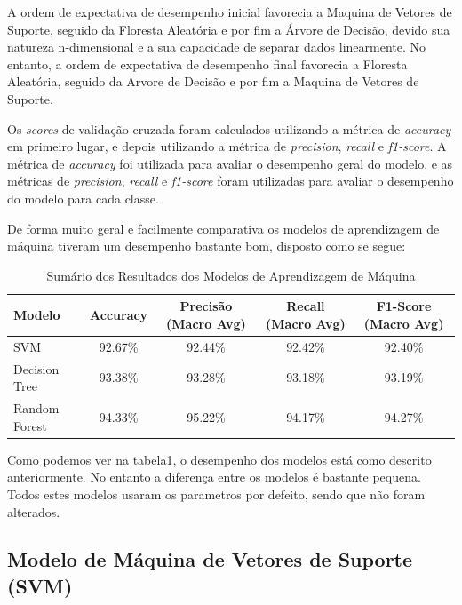 \documentclass{easychair}
\begin{document}
A ordem de expectativa de desempenho inicial favorecia a Maquina de Vetores de Suporte, seguido da Floresta Aleatória e por fim a Árvore de Decisão, devido sua natureza n-dimensional e a sua capacidade de separar dados linearmente. No entanto, a ordem de expectativa de desempenho final favorecia a Floresta Aleatória, seguido da Arvore de Decisão e por fim a Maquina de Vetores de Suporte.

Os \textit{scores} de validação cruzada foram calculados utilizando a métrica de \textit{accuracy} em primeiro lugar, e depois utilizando a métrica de \textit{precision}, \textit{recall} e \textit{f1-score}. A métrica de \textit{accuracy} foi utilizada para avaliar o desempenho geral do modelo, e as métricas de \textit{precision}, \textit{recall} e \textit{f1-score} foram utilizadas para avaliar o desempenho do modelo para cada classe.

De forma muito geral e facilmente comparativa os modelos de aprendizagem de máquina tiveram um desempenho bastante bom, disposto como se segue:

\begin{table}[ht]
  \centering
  \begin{tabular}{l c c c c}
  \toprule
  Modelo         & Accuracy & Precisão (Macro Avg)  & Recall (Macro Avg) & F1-Score (Macro Avg) \\
  \midrule
  SVM            & 92.67\%  & 92.44\%               & 92.42\%            & 92.40\%             \\
  Decision Tree  & 93.38\%  & 93.28\%               & 93.18\%            & 93.19\%             \\
  Random Forest  & 94.33\%  & 95.22\%               & 94.17\%            & 94.27\%             \\
  \bottomrule
  \end{tabular}
  \caption{Sumário dos Resultados dos Modelos de Aprendizagem de Máquina}
  \label{tab:model-comparison}
\end{table}

Como podemos ver na tabela\ref{tab:model-comparison}, o desempenho dos modelos está como descrito anteriormente. No entanto a diferença entre os modelos é bastante pequena. Todos estes modelos usaram os parametros por defeito, sendo que não foram alterados.

\subsection{Modelo de Máquina de Vetores de Suporte (SVM)}
\end{document}
